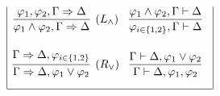\documentclass[10pt]{beamer}
\begin{document}
\begin{frame}
\begin{itemize}
\begin{minipage}{.4\textwidth}
{\begin{table}
\[\begin{array}{|c@{\hspace{.3cm}}c|}
\infer[(L_\wedge)]{\varphi_1\wedge\varphi_2,\Gamma\Rightarrow\Delta}{\varphi_{1},\varphi_{2},\Gamma\Rightarrow\Delta} & 
\infer[]{\varphi_{i\in\{1,2\}},\Gamma\vdash\Delta}{\varphi_1\wedge\varphi_2,\Gamma\vdash\Delta} \\[5mm]
\infer[(R_\vee)]{\Gamma\Rightarrow\Delta,\varphi_1\vee\varphi_2}{\Gamma\Rightarrow\Delta,
  \varphi_{i\in\{1,2\}} }&
\infer[]{\Gamma\vdash\Delta, \varphi_{1}, \varphi_{2}}{\Gamma\vdash\Delta,\varphi_1\vee\varphi_2}\\[3mm]
\hline
\end{array}\]
\end{table}
}
\end{minipage}
\end{itemize}
\end{frame}
\end{document}
